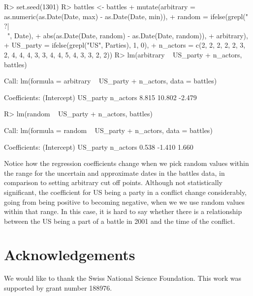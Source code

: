 \documentclass[
]{jss}
\begin{document}
\begin{CodeChunk}
\begin{CodeInput}
R> set.seed(1301)
R> battles <- battles %
+   mutate(arbitrary = as.numeric(as.Date(Date, max) - as.Date(Date, min)),
+          random = ifelse(grepl("\\?|\\~", Date),
+                          abs(as.Date(Date, random) - as.Date(Date, random)),
+                          arbitrary),
+          US_party = ifelse(grepl("US", Parties), 1, 0),
+          n_actors = c(2, 2, 2, 2, 2, 3, 2, 4, 4, 4, 3, 3, 4, 4, 5, 4, 3, 3, 2, 2))
R> lm(arbitrary ~ US_party + n_actors, battles)
\end{CodeInput}
\begin{CodeOutput}

Call:
lm(formula = arbitrary ~ US_party + n_actors, data = battles)

Coefficients:
(Intercept)     US_party     n_actors  
      8.815       10.802       -2.479  
\end{CodeOutput}
\begin{CodeInput}
R> lm(random ~ US_party + n_actors, battles)
\end{CodeInput}
\begin{CodeOutput}

Call:
lm(formula = random ~ US_party + n_actors, data = battles)

Coefficients:
(Intercept)     US_party     n_actors  
      0.538       -1.410        1.660  
\end{CodeOutput}
\end{CodeChunk}

Notice how the regression coefficients change when we pick random values
within the range for the uncertain and approximate dates in the battles
data, in comparison to setting arbitrary cut off points. Although not
statistically significant, the coefficient for US being a party in a
conflict change considerably, going from being positive to becoming
negative, when we we use random values within that range. In this case,
it is hard to say whether there is a relationship between the US being a
part of a battle in 2001 and the time of the conflict.

\hypertarget{acknowledgements}{%
\section{Acknowledgements}\label{acknowledgements}}

We would like to thank the Swiss National Science Foundation. This work
was supported by grant number 188976.

\renewcommand\refname{References}

\end{document}
